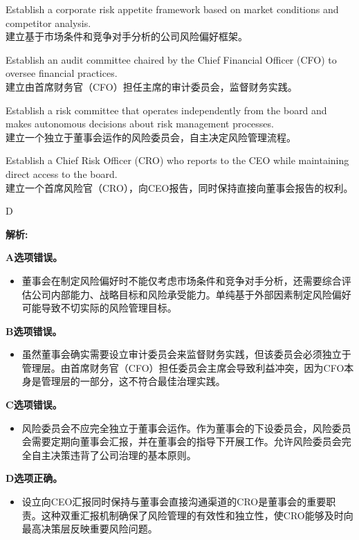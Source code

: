 \documentclass{article}
\newenvironment{explanation}
{\textbf{解析:}\par}
{\par}
\begin{document}
\begin{choices}
     \item Establish a corporate risk appetite framework based on market conditions and competitor analysis. \\
        建立基于市场条件和竞争对手分析的公司风险偏好框架。
    
    \item Establish an audit committee chaired by the Chief Financial Officer (CFO) to oversee financial practices. \\
    建立由首席财务官（CFO）担任主席的审计委员会，监督财务实践。
    
    \item Establish a risk committee that operates independently from the board and makes autonomous decisions about risk management processes. \\
    建立一个独立于董事会运作的风险委员会，自主决定风险管理流程。
    
    \item Establish a Chief Risk Officer (CRO) who reports to the CEO while maintaining direct access to the board. \\
    建立一个首席风险官（CRO），向CEO报告，同时保持直接向董事会报告的权利。
\end{choices}

\begin{correctanswer}
    D
\end{correctanswer}

\begin{explanation}
    \textbf{A选项错误。}
    \begin{itemize}
        \item 董事会在制定风险偏好时不能仅考虑市场条件和竞争对手分析，还需要综合评估公司内部能力、战略目标和风险承受能力。单纯基于外部因素制定风险偏好可能导致不切实际的风险管理目标。
    \end{itemize}
    
    \textbf{B选项错误。}
    \begin{itemize}
        \item 虽然董事会确实需要设立审计委员会来监督财务实践，但该委员会必须独立于管理层。由首席财务官（CFO）担任委员会主席会导致利益冲突，因为CFO本身是管理层的一部分，这不符合最佳治理实践。
    \end{itemize}
    
    \textbf{C选项错误。}
    \begin{itemize}
        \item 风险委员会不应完全独立于董事会运作。作为董事会的下设委员会，风险委员会需要定期向董事会汇报，并在董事会的指导下开展工作。允许风险委员会完全自主决策违背了公司治理的基本原则。
    \end{itemize}
    
    \textbf{D选项正确。}
    \begin{itemize}
        \item 设立向CEO汇报同时保持与董事会直接沟通渠道的CRO是董事会的重要职责。这种双重汇报机制确保了风险管理的有效性和独立性，使CRO能够及时向最高决策层反映重要风险问题。
    \end{itemize}
\end{explanation}
\end{document}
